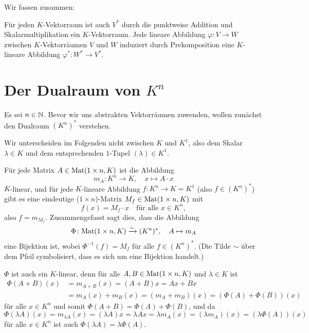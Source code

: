\documentclass[a4paper,10pt]{article}
\begin{document}
Wir fassen zusammen:

\begin{shaded}
 Für jeden $K$-Vektorraum ist auch $V^*$ durch die punktweise Addition und Skalarmultiplikation ein $K$-Vektorraum. Jede lineare Abbildung $\varphi \colon V \to W$ zwischen $K$-Vektorräumen $V$ und $W$ induziert durch Prekomposition eine $K$-lineare Abbildung $\varphi^* \colon W^* \to V^*$.
\end{shaded}










\section{Der Dualraum von $K^n$}\label{sec: dual space of Kn}
Es sei $n \in \mathbb{N}$. Bevor wir uns abstrakten Vektorräumen zuwenden, wollen zunächst den Dualraum $(K^n)^*$ verstehen.

\begin{bem}
 Wir unterscheiden im Folgenden nicht zwischen $K$ und $K^1$, also dem Skalar $\lambda \in K$ und dem entsprechenden $1$-Tupel $(\lambda) \in K^1$.
\end{bem}

Für jede Matrix $A \in \mathrm{Mat}(1 \times n, K)$ ist die Abbildung
\[
 m_A \colon K^n \to K, \quad x \mapsto A \cdot x
\]
$K$-linear, und für jede $K$-lineare Abbildung $f \colon K^n \to K = K^1$ (also $f \in (K^n)^*$) gibt es eine eindeutige ($1 \times n$)-Matrix $M_f \in \mathrm{Mat}(1 \times n, K)$ mit
\[
 f(x) = M_f \cdot x
 \quad \text{für alle $x \in K^n$},
\]
also $f = m_{M_f}$. Zusammengefasst sagt dies, dass die Abbildung
\[
 \Phi \colon \mathrm{Mat}(1 \times n, K) \xrightarrow{\sim} (K^n)^*, \quad A \mapsto m_A
\]
eine Bijektion ist, wobei $\Phi^{-1}(f) = M_f$ für alle $f \in (K^n)^*$. (Die Tilde $\sim$ über dem Pfeil symbolisiert, dass es sich um eine Bijektion handelt.)

$\Phi$ ist auch ein $K$-linear, denn für alle $A, B \in \mathrm{Mat}(1 \times n, K)$ und $\lambda \in K$ ist
\begin{align*}
 \Phi(A+B)(x)
 &= m_{A+B}(x)
 = (A+B)x
 = Ax + Bx \\
 &= m_A(x) + m_B(x)
 = (m_A+m_B)(x)
 = (\Phi(A)+\Phi(B))(x)
\end{align*}
für alle $x \in K^n$ und somit $\Phi(A+B) = \Phi(A) + \Phi(B)$, und da
\[
 \Phi(\lambda A)(x)
 = m_{\lambda A}(x)
 = (\lambda A)x
 = \lambda Ax
 = \lambda m_A(x)
 = (\lambda m_A)(x)
 = (\lambda \Phi(A))(x)
\]
für alle $x \in K^n$ ist auch $\Phi(\lambda A) = \lambda \Phi(A)$.
\end{document}
